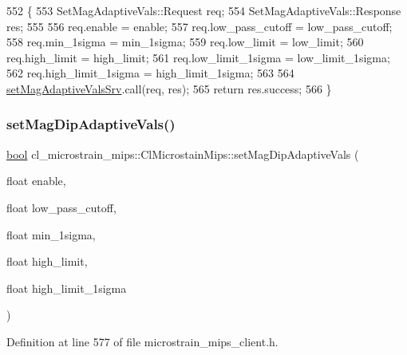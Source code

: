 \begin{DoxyCode}
552     \{
553         SetMagAdaptiveVals::Request req;
554         SetMagAdaptiveVals::Response res;
555 
556         req.enable = enable;
557         req.low\_pass\_cutoff = low\_pass\_cutoff;
558         req.min\_1sigma = min\_1sigma;
559         req.low\_limit = low\_limit;
560         req.high\_limit = high\_limit;
561         req.low\_limit\_1sigma = low\_limit\_1sigma;
562         req.high\_limit\_1sigma = high\_limit\_1sigma;
563 
564         \hyperlink{classcl__microstrain__mips_1_1ClMicrostainMips_aeb9fb755367cd253b65bf826e421cc05}{setMagAdaptiveValsSrv}.call(req, res);
565         \textcolor{keywordflow}{return} res.success;
566     \}
\end{DoxyCode}
\mbox{\label{classcl__microstrain__mips_1_1ClMicrostainMips_a1b81980570d6ff87b58a823a73cc992d}} 
\subsubsection{\texorpdfstring{set\+Mag\+Dip\+Adaptive\+Vals()}{setMagDipAdaptiveVals()}}
{\footnotesize\ttfamily \hyperlink{classbool}{bool} cl\+\_\+microstrain\+\_\+mips\+::\+Cl\+Microstain\+Mips\+::set\+Mag\+Dip\+Adaptive\+Vals (\begin{DoxyParamCaption}\item[{float}]{enable,  }\item[{float}]{low\+\_\+pass\+\_\+cutoff,  }\item[{float}]{min\+\_\+1sigma,  }\item[{float}]{high\+\_\+limit,  }\item[{float}]{high\+\_\+limit\+\_\+1sigma }\end{DoxyParamCaption})\hspace{0.3cm}{\ttfamily [inline]}}



Definition at line 577 of file microstrain\+\_\+mips\+\_\+client.\+h.


